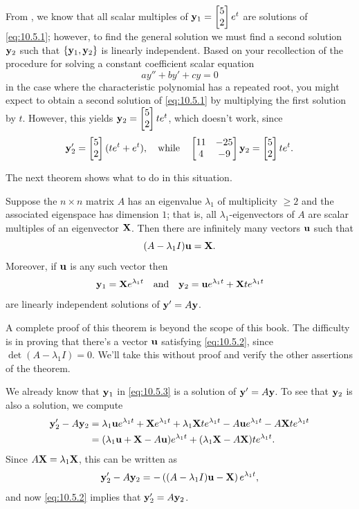 From , we know that all scalar multiples of
$\mathbf{y}_1=\begin{bmatrix}5\\2\end{bmatrix}e^t$ are solutions of \eqref{eq:10.5.1};
however,
to find the general solution we must find a second solution $\mathbf{y}_2$ such that $\{\mathbf{y}_1,\mathbf{y}_2\}$ is linearly independent.
Based on your recollection of the procedure for solving a constant
coefficient scalar equation
\[
ay''+by'+cy=0
\]
in the case where the characteristic polynomial has a repeated root,
you might expect to obtain a second solution of \eqref{eq:10.5.1} by
multiplying the first solution by $t$. However, this yields $\mathbf{y}_2=\begin{bmatrix}5\\2\end{bmatrix}te^t$, which doesn't work, since
\[
\mathbf{y}_2'=\begin{bmatrix}5\\2\end{bmatrix}(te^t+e^t),\quad\text{while}\quad
\begin{bmatrix}11&-25\\4&-9\end{bmatrix}\mathbf{y}_2=\begin{bmatrix}5\\2\end{bmatrix}te^t.
\]

The next theorem shows what to do in this situation.

\begin{theorem}\label{thmtype:10.5.1}
Suppose the $n\times n$ matrix $A$ has an eigenvalue $\lambda_1$
of multiplicity $\ge2$ and the associated eigenspace has dimension
$1$; that is, all $\lambda_1$-eigenvectors of $A$ are scalar
multiples
of  an eigenvector $\mathbf{X}$.  Then there are infinitely many vectors
$\mathbf{u}$ such that
\begin{equation}\label{eq:10.5.2}
(A-\lambda_1I)\mathbf{u}=\mathbf{X}.
\end{equation}
Moreover, if $\mathbf{u}$ is any such vector  then
\begin{equation}\label{eq:10.5.3}
\mathbf{y}_1=\mathbf{X}e^{\lambda_1t}\quad\text{and}\quad
\mathbf{y}_2=\mathbf{u}e^{\lambda_1t}+\mathbf{X}te^{\lambda_1t}
\end{equation}
are linearly independent  solutions of $\mathbf{y}'=A\mathbf{y}$.
\end{theorem}

A complete proof of this theorem is beyond the scope of this book. The
difficulty is in proving that there's a vector $\mathbf{u}$ satisfying
\eqref{eq:10.5.2}, since $\det(A-\lambda_1I)=0$. We'll take this without
proof and verify the other assertions of the theorem.

We already know that $\mathbf{y}_1$ in \eqref{eq:10.5.3} is a solution of
$\mathbf{y}'=A\mathbf{y}$. To see that $\mathbf{y}_2$ is also a solution, we
compute
\begin{align*}
\mathbf{y}_2'-A\mathbf{y}_2
&=\lambda_1\mathbf{u}e^{\lambda_1t}+\mathbf{X} e^{\lambda_1t}
+\lambda_1\mathbf{X} te^{\lambda_1t}-A\mathbf{u}e^{\lambda_1t}
-A\mathbf{X} te^{\lambda_1t}\\
&=(\lambda_1\mathbf{u}+\mathbf{X} -A\mathbf{u})e^{\lambda_1t}
+(\lambda_1\mathbf{X} -A\mathbf{X} )te^{\lambda_1t}.
\end{align*}
Since $A\mathbf{X}=\lambda_1\mathbf{X}$, this can be written as
\[
\mathbf{y}_2'-A\mathbf{y}_2=-
\left((A-\lambda_1I)\mathbf{u}-\mathbf{X}\right)e^{\lambda_1t},
\]
and now \eqref{eq:10.5.2} implies that
$\mathbf{y}_2'=A\mathbf{y}_2$.

